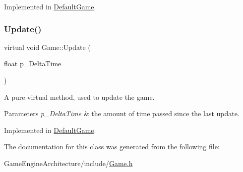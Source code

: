 Implemented in \mbox{\hyperlink{class_default_game_ad5cc1efff4785b26da69b4dc942cc9fd}{Default\+Game}}.

\mbox{\label{class_game_ab15084e492f17b36b90314f614b659d3}} 
\subsubsection{\texorpdfstring{Update()}{Update()}}
{\footnotesize\ttfamily virtual void Game\+::\+Update (\begin{DoxyParamCaption}\item[{float}]{p\+\_\+\+Delta\+Time }\end{DoxyParamCaption})\hspace{0.3cm}{\ttfamily [pure virtual]}}



A pure virtual method, used to update the game. 


\begin{DoxyParams}{Parameters}
{\em p\+\_\+\+Delta\+Time} & the amount of time passed since the last update. \\
\hline
\end{DoxyParams}


Implemented in \mbox{\hyperlink{class_default_game_a51e32950165cab20f9ba4e06bfc13e2f}{Default\+Game}}.



The documentation for this class was generated from the following file\+:\begin{DoxyCompactItemize}
\item 
Game\+Engine\+Architecture/include/\mbox{\hyperlink{_game_8h}{Game.\+h}}\end{DoxyCompactItemize}
